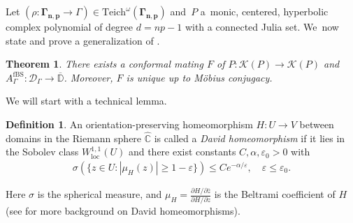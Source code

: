 \documentclass[JEP,XML,SOM,Unicode,NoFloatCountersInSection,published]{cedram}
\newtheorem{theorem}[lemma]{Theorem}
\theoremstyle{definition}
\newtheorem{definition}[lemma]{Definition}
\theoremstyle{remark}
\newcommand{\C}{\mathbb{C}}
\newcommand{\D}{\mathbb{D}}
\begin{document}
Let $(\rho: \pmb{\Gamma_{n,p}}\to\Gamma)\in\mathrm{Teich}^\omega(\pmb{\Gamma_{n,p}})$ and~$P$ a~monic, centered, hyperbolic complex polynomial of degree $d=np-1$ with a connected Julia set. We~now state and prove a generalization of \cite[Th.\,3.6]{MM1}.

\begin{theorem}\label{conf_mat_thm}
There exists a conformal mating $F$ of $P:\mathcal{K}(P)\to\mathcal{K}(P)$ and $A_{\Gamma}^{\mathrm{fBS}}:\mathcal{D}_{\Gamma}\to \overline{\D}$. Moreover, $F$ is unique up to Möbius conjugacy.
\end{theorem}

We will start with a technical lemma.

\begin{definition}\label{david_def}
An orientation-preserving homeomorphism $H: U\to V$ between domains in the Riemann sphere $\widehat{\C}$ is called a \textit{David homeomorphism} if it lies in the Sobolev class $W^{1,1}_{\text{loc}}(U)$ and there exist constants $C,\alpha,\varepsilon_0>0$ with
\begin{align}\label{david_cond}
\sigma(\{z\in U: |\mu_H(z)|\geq 1-\varepsilon\}) \leq Ce^{-\alpha/\varepsilon}, \quad \varepsilon\leq \varepsilon_0.
\end{align}
\end{definition}
Here $\sigma$ is the spherical measure, and
$\mu_H= \frac{\partial H/ \partial\overline{z}}{\partial H/\partial z}$
is the Beltrami coefficient of $H$ (see \cite[Chap.\,20]{AIM09} for more background on David homeomorphisms).
\end{document}
